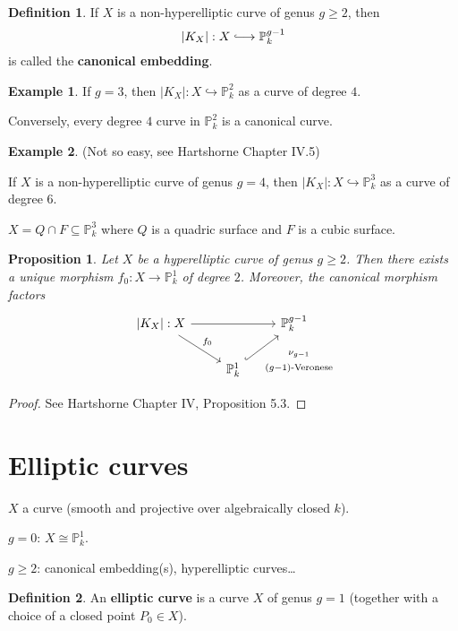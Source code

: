 \documentclass[12pt]{article}
\newtheorem*{proposition}{Proposition}
\theoremstyle{definition}
\newtheorem*{definition}{Definition}
\newtheorem*{example}{Example}
\begin{document}
\begin{definition}
If $X$ is a non-hyperelliptic curve of genus $g\geq2$, then
\[|K_X|:X\lhook\joinrel\longrightarrow\mathbb P_k^{g-1}\]
is called the \textbf{canonical embedding}.
\end{definition}

\begin{example}
If $g=3$, then $|K_X|:X\hookrightarrow\mathbb P_k^2$ as a curve of degree $4$.

Conversely, every degree $4$ curve in $\mathbb P_k^2$ is a canonical curve.
\end{example}

\begin{example}
(Not so easy, see Hartshorne \cite{hartshorne2013algebraic} Chapter IV.5)

If $X$ is a non-hyperelliptic curve of genus $g=4$, then $|K_X|:X\hookrightarrow\mathbb P_k^3$ as a curve of degree $6$.

$X=Q\cap F\subseteq\mathbb P_k^3$ where $Q$ is a quadric surface and $F$ is a cubic surface.
\end{example}

\begin{proposition}
Let $X$ be a hyperelliptic curve of genus $g\geq2$. Then there exists a unique morphism $f_0:X\rightarrow\mathbb P_k^1$ of degree $2$. Moreover, the canonical morphism factors
\[\begin{tikzcd}{|K_X|:X}\arrow[rr]\arrow[rd,"f_0"]&&\mathbb P_k^{g-1}\\&\mathbb P_k^1\arrow[ru,hook,"\substack{\nu_{g-1}\\\\(g-1)\text{-Veronese}}",swap]\end{tikzcd}\]
\end{proposition}

\begin{proof}
See Hartshorne \cite{hartshorne2013algebraic} Chapter IV, Proposition 5.3.
\end{proof}

\section{Elliptic curves}
$X$ a curve (smooth and projective over algebraically closed $k$).

$g=0$: $X\cong\mathbb P_k^1$.

$g\geq2$: canonical embedding(s), hyperelliptic curves\ldots

\begin{definition}
An \textbf{elliptic curve} is a curve $X$ of genus $g=1$ (together with a choice of a closed point $P_0\in X$).
\end{definition}
\end{document}
